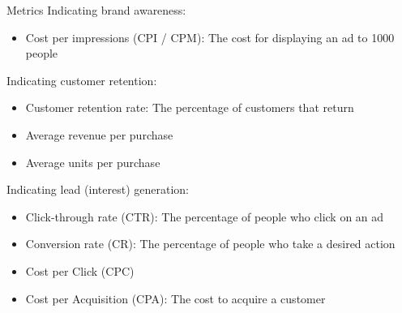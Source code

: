\begin{definition}
    {Metrics}
    Indicating brand awareness:
    \begin{itemize}
        \item Cost per impressions (CPI / CPM): The cost for displaying an ad to 1000 people
    \end{itemize}
    Indicating customer retention:
    \begin{itemize}
        \item Customer retention rate: The percentage of customers that return
        \item Average revenue per purchase
        \item Average units per purchase
    \end{itemize}
    Indicating lead (interest) generation:
    \begin{itemize}
        \item Click-through rate (CTR): The percentage of people who click on an ad
        \item Conversion rate (CR): The percentage of people who take a desired action
        \item Cost per Click (CPC)
        \item Cost per Acquisition (CPA): The cost to acquire a customer
    \end{itemize}
\end{definition}